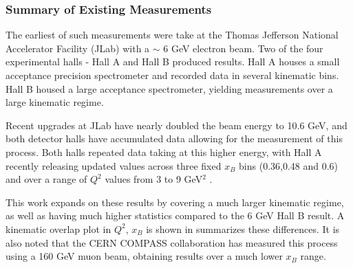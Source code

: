         \subsubsection*{Summary of Existing Measurements}

         The earliest of such measurements were take at the Thomas Jefferson National Accelerator Facility (JLab) with a $\sim$ 6 GeV electron beam. Two of the four experimental halls - Hall A \parencite{Fuchey2011ExclusiveRegime} and Hall B \parencite{Bedlinskiy2014ExclusiveCLAS} produced \xsec results. Hall A houses a small acceptance precision spectrometer and recorded data in several kinematic bins. Hall B housed a large acceptance spectrometer, yielding \xsec measurements over a large kinematic regime. 
         
         Recent upgrades at JLab have nearly doubled the beam energy to 10.6 GeV, and both detector halls have accumulated data allowing for the measurement of this process. Both halls repeated data taking at this higher energy, with Hall A recently releasing updated \xsec values across three fixed $x_B$ bins (0.36,0.48 and 0.6) and over a range of $Q^2$ values from 3 to 9 GeV$^2$ \parencite{Dlamini2021DeepRegime}. 
         
         This work expands on these results by covering a much larger kinematic regime, as well as having much higher statistics compared to the 6 GeV Hall B result. A kinematic overlap plot in $Q^2$, $x_B$ is shown in  summarizes these differences. It is also noted that the CERN COMPASS collaboration \parencite{Alexeev2020MeasurementProton} has measured this process using a 160 GeV muon beam, obtaining results over a much lower $x_B$ range.  

       
    

